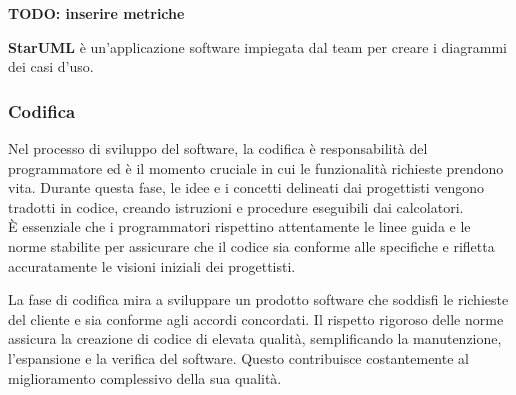 \textbf{TODO: inserire metriche}

\textbf{StarUML} è un'applicazione software impiegata dal team per creare i diagrammi dei casi d'uso.

\subsubsection{Codifica}
Nel processo di sviluppo del software, la codifica è responsabilità del programmatore ed è il momento cruciale in cui le funzionalità richieste prendono vita. Durante questa fase, le idee e i concetti delineati dai progettisti vengono tradotti in codice, creando istruzioni e procedure eseguibili dai calcolatori.\\ È essenziale che i programmatori rispettino attentamente le linee guida e le norme stabilite per assicurare che il codice sia conforme alle specifiche e rifletta accuratamente le visioni iniziali dei progettisti.

La fase di codifica mira a sviluppare un prodotto software che soddisfi le richieste del cliente e sia conforme agli accordi concordati. Il rispetto rigoroso delle norme assicura la creazione di codice di elevata qualità, semplificando la manutenzione, l'espansione e la verifica del software. Questo contribuisce costantemente al miglioramento complessivo della sua qualità.

